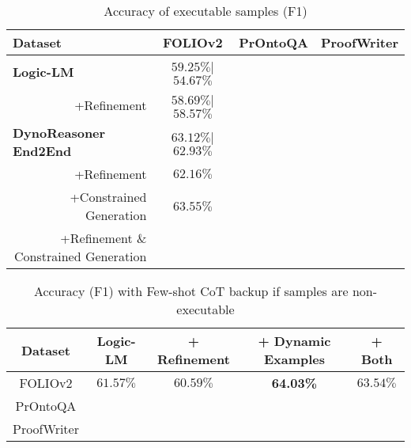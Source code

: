 \documentclass[conference]{IEEEtran}
\begin{document}
\begin{table*}[t]
    \centering
    \begin{tabular}{|l|c|c|c|}
    \hline
    \textbf{Dataset}                                                            & \multicolumn{1}{c|}{FOLIOv2} & \multicolumn{1}{c|}{PrOntoQA} & \multicolumn{1}{c|}{ProofWriter} \\ \hline
    \textbf{Logic-LM}                                                           & $59.25\%$|$54.67\%$      &  &  \\ 
    \multicolumn{1}{|r|}{+Refinement}                                           & $58.69\%$|$58.57\%$      &  &  \\ \hline  
    \textbf{DynoReasoner End2End}                                                       & $63.12\%$|$62.93\%$      &  &  \\ 
    \multicolumn{1}{|r|}{\hspace{1cm}+Refinement}                               & $62.16\%$                &  &  \\ 
    \multicolumn{1}{|r|}{\hspace{1cm}+Constrained Generation}                   & $63.55\%$                &  &  \\ 
    \multicolumn{1}{|r|}{\hspace{1cm}+Refinement \& Constrained Generation}     &                          &  &  \\ \hline
\end{tabular}
\caption{Accuracy of executable samples (F1)}    
\end{table*}

\begin{table*}[t]
    \centering
    \begin{tabular}{|c|c|c|c|c|}
    \hline
    \textbf{Dataset}                    & \textbf{Logic-LM}       & \textbf{+ Refinement}     &      \textbf{+ Dynamic Examples}  & \textbf{+ Both}             \\ \hline
    FOLIOv2                             &      $61.57\%$           &     $60.59\%$             &      \textbf{64.03\%}                      &           $63.54\%$        \\ \hline
    PrOntoQA                            &                          &                           &                                     &                          \\ \hline
    ProofWriter                         &                          &                           &                                     &                          \\ \hline
\end{tabular}
\caption{Accuracy (F1) with Few-shot CoT backup if samples are non-executable}    
\end{table*}
\end{document}
